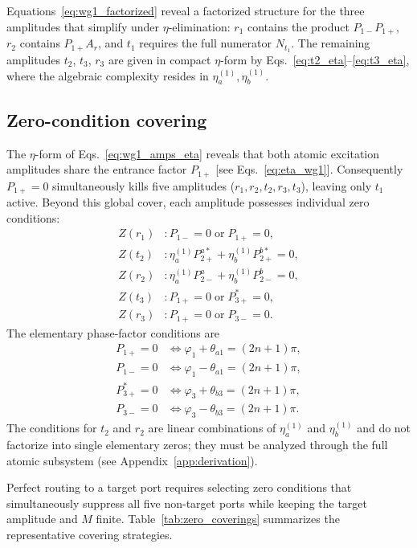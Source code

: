 \documentclass[aps,pra,reprint,superscriptaddress,nofootinbib,longbibliography,floatfix]{revtex4-2}
\newcommand{\ph}{\varphi}
\newcommand{\thaone}{\theta_{a1}}
\newcommand{\thbthree}{\theta_{b3}}
\newcommand{\Poneplus}{P_{1+}}
\newcommand{\Poneminus}{P_{1-}}
\begin{document}
Equations~\eqref{eq:wg1_factorized} reveal a factorized structure for the three amplitudes that simplify under $\eta$-elimination: $r_1$ contains the product $\Poneminus\Poneplus$, $r_2$ contains $\Poneplus A_r$, and $t_1$ requires the full numerator $N_{t_1}$. The remaining amplitudes $t_2$, $t_3$, $r_3$ are given in compact $\eta$-form by Eqs.~\eqref{eq:t2_eta}--\eqref{eq:t3_eta}, where the algebraic complexity resides in $\eta_a^{(1)},\eta_b^{(1)}$.

\subsection{Zero-condition covering}

The $\eta$-form of Eqs.~\eqref{eq:wg1_amps_eta} reveals that both atomic excitation amplitudes share the entrance factor $\Poneplus$ [see Eqs.~\eqref{eq:eta_wg1}]. Consequently $\Poneplus=0$ simultaneously kills five amplitudes ($r_1,r_2,t_2,r_3,t_3$), leaving only $t_1$ active. Beyond this global cover, each amplitude possesses individual zero conditions:
\begin{align}
Z(r_1)&: \Poneminus=0 \;\text{or}\; \Poneplus=0,\\
Z(t_2)&: \eta_a^{(1)}P_{2+}^{a*} + \eta_b^{(1)}P_{2+}^{b*}=0,\\
Z(r_2)&: \eta_a^{(1)}P_{2-}^{a} + \eta_b^{(1)}P_{2-}^{b}=0,\\
Z(t_3)&: \Poneplus=0 \;\text{or}\; P_{3+}^*=0,\\
Z(r_3)&: \Poneplus=0 \;\text{or}\; P_{3-}=0.
\end{align}
The elementary phase-factor conditions are
\begin{subequations}
\begin{align}
\Poneplus=0 &\Longleftrightarrow \ph_1+\thaone = (2n+1)\pi,\\
\Poneminus=0 &\Longleftrightarrow \ph_1-\thaone = (2n+1)\pi,\\
P_{3+}^*=0 &\Longleftrightarrow \ph_3+\thbthree = (2n+1)\pi,\\
P_{3-}=0 &\Longleftrightarrow \ph_3-\thbthree = (2n+1)\pi.
\end{align}
\end{subequations}
The conditions for $t_2$ and $r_2$ are linear combinations of $\eta_a^{(1)}$ and $\eta_b^{(1)}$ and do not factorize into single elementary zeros; they must be analyzed through the full atomic subsystem (see Appendix~\ref{app:derivation}).

Perfect routing to a target port requires selecting zero conditions that simultaneously suppress all five non-target ports while keeping the target amplitude and $M$ finite.
Table~\ref{tab:zero_coverings} summarizes the representative covering strategies.
\end{document}
